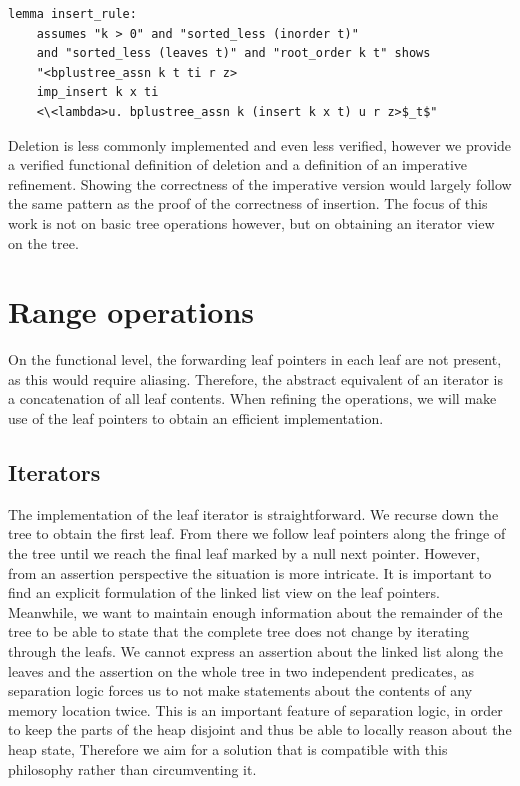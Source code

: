 \documentclass[a4paper,UKenglish,cleveref, autoref, thm-restate]{lipics-v2021}
\begin{document}
\begin{lstlisting}[mathescape=true, language=Isabelle,label=lst:insert-refines]
lemma insert_rule:
    assumes "k > 0" and "sorted_less (inorder t)"
    and "sorted_less (leaves t)" and "root_order k t" shows
    "<bplustree_assn k t ti r z>
    imp_insert k x ti
    <\<lambda>u. bplustree_assn k (insert k x t) u r z>$_t$"
\end{lstlisting}
  

Deletion is less commonly implemented and even less verified,
however we provide a verified functional definition of deletion and a definition of an imperative refinement.
Showing the correctness of the imperative version would largely follow
the same pattern as the proof of the correctness of insertion.
The focus of this work is not on basic tree operations
however, but on obtaining an iterator view on the tree.


\section{Range operations}
\label{sec:range}

On the functional level, the forwarding leaf pointers in each leaf
are not present, as this would require aliasing.
Therefore, the abstract equivalent of an iterator
is a concatenation of all leaf contents.
When refining the operations, we will make use of the leaf pointers
to obtain an efficient implementation.

\subsection{Iterators}
\label{sec:imperative_iter}

The implementation of the leaf iterator is straightforward.
We recurse down the tree to obtain the first leaf.
From there we follow leaf
pointers along the fringe of the tree until we reach the final leaf marked by a null next pointer.
However, from an assertion perspective the situation is more intricate.
It is important to find an explicit formulation of the linked list view on the leaf pointers.
Meanwhile, we want to maintain enough information about the remainder of the tree
to be able to state that the complete tree does not change by iterating through the leafs.
We cannot express an assertion about the linked list along the leaves
and the assertion on the whole tree in two independent predicates,
as separation logic forces us to not make statements about the contents of
any memory location twice.
This is an important feature of separation logic,
in order to keep the parts of the heap disjoint and
thus be able to locally reason about the heap state,
Therefore we aim for a solution that is compatible with this philosophy rather than circumventing it.
\end{document}
